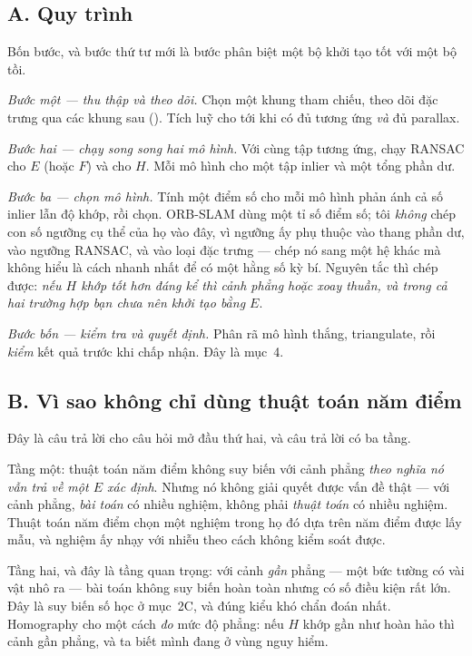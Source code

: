\documentclass[../../vslam.tex]{subfiles}
\begin{document}
\subsection{A. Quy trình}

Bốn bước, và bước thứ tư mới là bước phân biệt một bộ khởi tạo tốt với một bộ tồi.

\emph{Bước một --- thu thập và theo dõi.} Chọn một khung tham chiếu, theo dõi đặc trưng qua các khung sau (). Tích luỹ cho tới khi có đủ tương ứng \emph{và} đủ parallax.

\emph{Bước hai --- chạy song song hai mô hình.} Với cùng tập tương ứng, chạy RANSAC cho \(E\) (hoặc \(F\)) và cho \(H\). Mỗi mô hình cho một tập inlier và một tổng phần dư.

\emph{Bước ba --- chọn mô hình.} Tính một điểm số cho mỗi mô hình phản ánh cả số inlier lẫn độ khớp, rồi chọn. ORB-SLAM \cite{murartal2015orbslam} dùng một tỉ số điểm số; tôi \emph{không} chép con số ngưỡng cụ thể của họ vào đây, vì ngưỡng ấy phụ thuộc vào thang phần dư, vào ngưỡng RANSAC, và vào loại đặc trưng --- chép nó sang một hệ khác mà không hiểu là cách nhanh nhất để có một hằng số kỳ bí. Nguyên tắc thì chép được: \emph{nếu \(H\) khớp tốt hơn đáng kể thì cảnh phẳng hoặc xoay thuần, và trong cả hai trường hợp bạn chưa nên khởi tạo bằng \(E\)}.

\emph{Bước bốn --- kiểm tra và quyết định.} Phân rã mô hình thắng, triangulate, rồi \emph{kiểm} kết quả trước khi chấp nhận. Đây là mục~4.

\subsection{B. Vì sao không chỉ dùng thuật toán năm điểm}

Đây là câu trả lời cho câu hỏi mở đầu thứ hai, và câu trả lời có ba tầng.

Tầng một: thuật toán năm điểm không suy biến với cảnh phẳng \emph{theo nghĩa nó vẫn trả về một \(E\) xác định}. Nhưng nó không giải quyết được vấn đề thật --- với cảnh phẳng, \emph{bài toán} có nhiều nghiệm, không phải \emph{thuật toán} có nhiều nghiệm. Thuật toán năm điểm chọn một nghiệm trong họ đó dựa trên năm điểm được lấy mẫu, và nghiệm ấy nhạy với nhiễu theo cách không kiểm soát được.

Tầng hai, và đây là tầng quan trọng: với cảnh \emph{gần} phẳng --- một bức tường có vài vật nhô ra --- bài toán không suy biến hoàn toàn nhưng có số điều kiện rất lớn. Đây là suy biến số học ở  mục~2C, và đúng kiểu khó chẩn đoán nhất. Homography cho một cách \emph{đo} mức độ phẳng: nếu \(H\) khớp gần như hoàn hảo thì cảnh gần phẳng, và ta biết mình đang ở vùng nguy hiểm.
\end{document}
